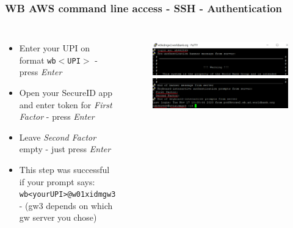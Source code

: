 \documentclass[aspectratio=169]{beamer} %
\begin{document}
\begin{frame}
	\frametitle{WB AWS command line access - SSH - Authentication}
	\begin{columns}[c]
		\begin{itemize}
			\item Enter your UPI on format \texttt{wb$<$UPI$>$} -
			press \textit{Enter}
			\item Open your SecureID app and 
			enter token for \textit{First Factor}
			- press \textit{Enter}
			\item Leave \textit{Second Factor} empty - 
			just press \textit{Enter}
			\item This step was successful if your prompt says:
			\texttt{wb<yourUPI>@w01xidmgw3}
			- (gw3 depends on which gw server you chose)
		\end{itemize}

		\begin{figure}
			\centering
			\includegraphics[width=\textwidth]{./img/access-2a.png}
			\includegraphics[width=\textwidth]{./img/access-2b.png}
		\end{figure}

	\end{columns}
\end{frame}
\end{document}
